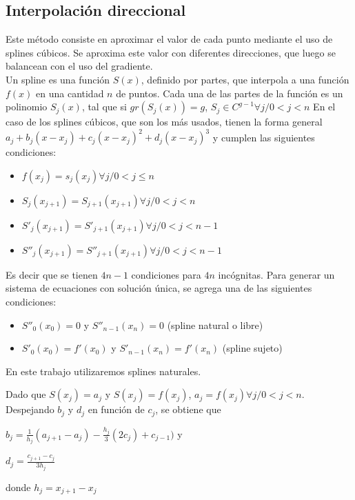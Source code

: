 \documentclass[a4paper]{article}
\begin{document}
\subsection {Interpolación direccional}
Este método consiste en aproximar el valor de cada punto mediante el uso de splines cúbicos. Se aproxima este valor con diferentes direcciones, que luego se balancean con el uso del gradiente.\\
Un spline es una función $S(x)$, definido por partes, que interpola a una función $f(x)$ en una cantidad $n$ de puntos. Cada una de las partes de la función es un polinomio $S_j(x)$, tal que si $gr(S_j(x))=g$, $S_j\in C^{g-1} \forall j/0<j<n$ 
En el caso de los splines cúbicos, que son los más usados, tienen la forma general $a_j+b_j(x-x_j)+c_j(x-x_j)^2+d_j(x-x_j)^3$ y cumplen las siguientes condiciones:

\begin{itemize}
\item $f(x_j)=s_j(x_j) \forall j/0<j\leq n$ 
\item $S_j(x_{j+1})=S_{j+1}(x_{j+1}) \forall j/0<j<n$
\item $S'_j(x_{j+1})=S'_{j+1}(x_{j+1}) \forall j/0<j<n-1$
\item $S''_j(x_{j+1})=S''_{j+1}(x_{j+1}) \forall j/0<j<n-1$
\end{itemize}

Es decir que se tienen $4n-1$ condiciones para $4n$ incógnitas. Para generar un sistema de ecuaciones con solución única, se agrega una de las siguientes condiciones:

\begin{itemize}
\item $S''_0(x_0)=0$ y $S''_{n-1}(x_n)=0$  (spline natural o libre)
\item $S'_0(x_0)=f'(x_0)$ y $S'_{n-1}(x_n)=f'(x_n)$ (spline sujeto)
\end{itemize}

En este trabajo utilizaremos splines naturales.

Dado que $S(x_j)=a_j$ y $S(x_j)=f(x_j)$, $a_j=f(x_j) \forall j/0<j<n$. Despejando $b_j$ y $d_j$ en función de $c_j$, se obtiene que

$b_j=\frac{1}{h_j}(a_{j+1}-a_j)-\frac{h_j}{3}(2c_j)+c_{j-1})$ y

$d_j=\frac{c_{j+1}-c_j}{3h_j}$

donde $h_j=x_{j+1}-x_j$
\end{document}
